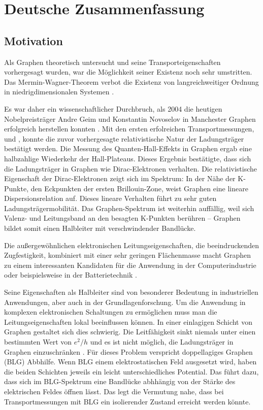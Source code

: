 \section*{Deutsche Zusammenfassung}
\subsection*{Motivation}

Als Graphen theoretisch untersucht und seine Transporteigenschaften vorhergesagt wurden, war die M\"oglichkeit seiner Existenz noch sehr umstritten. Das Mermin-Wagner-Theorem verbot die Existenz von langreichweitiger Ordnung in niedrigdimensionalen Systemen \cite{Mermin1966}.

Es war daher ein wissenschaftlicher Durchbruch, als 2004 die heutigen Nobelpreistr\"ager Andre Geim und Konstantin Novoselov in Manchester Graphen erfolgreich herstellen konnten \cite{Novoselov2004}. Mit den ersten erfolreichen Transportmessungen, \cite{Zhang2005} und \cite{Novoselov2005}, konnte die zuvor vorhergesagte relativistische Natur der Ladungstr\"ager \cite{Semenoff1984} best\"atigt werden. Die Messung des Quanten-Hall-Effekts in Graphen ergab eine halbzahlige Wiederkehr der Hall-Plateaus. Dieses Ergebnis best\"atigte, dass sich die Ladungstr\"ager in Graphen wie Dirac-Elektronen verhalten.
Die relativistische Eigenschaft der Dirac-Elektronen zeigt sich im Spektrum: In der N\"ahe der K-Punkte, den Eckpunkten der ersten Brillouin-Zone, weist Graphen eine lineare Dispersionsrelation auf. Dieses lineare Verhalten f\"uhrt zu sehr guten Ladungstr\"agermobilit\"at. Das Graphen-Spektrum ist weiterhin auff\"allig, weil sich Valenz- und Leitungsband an den besagten K-Punkten ber\"uhren -- Graphen bildet somit einen Halbleiter mit verschwindender Bandl\"ucke. 

Die au{\ss}ergew\"ohnlichen elektronischen Leitungseigenschaften, die beeindruckenden Zugfestigkeit, kombiniert mit einer sehr geringen Fl\"achenmasse macht Graphen zu einem interessanten Kandidaten f\"ur die Anwendung in der Computerindustrie \cite{Jurewicz2014} oder beispielsweise in der Batterietechnik \cite{Son2017}.

Seine Eigenschaften als Halbleiter sind von besonderer Bedeutung in industriellen Anwendungen, aber auch in der Grundlagenforschung. Um die Anwendung in komplexen elektronischen Schaltungen zu erm\"oglichen muss man die Leitungseigenschaften lokal beeinflussen k\"onnen. In einer einlagigen Schicht von Graphen gestaltet sich dies schwierig. Die Leitf\"ahigkeit sinkt niemals unter einen bestimmten Wert von $e^2/h$ und es ist nicht m\"oglich, die Ladungstr\"ager in Graphen einzuschr\"anken \cite{Katsnelson2006}. F\"ur dieses Problem verspricht doppellagiges Graphen (BLG) Abbhilfe. Wenn BLG einem elektrostatischen Feld ausgesetzt wird, haben die beiden Schichten jeweils ein leicht unterschiedliches Potential. Das f\"uhrt dazu, dass sich im BLG-Spektrum eine Bandl\"ucke abhh\"angig von der St\"arke des elektrischen Feldes \"offnen l\"asst. Das legt die Vermutung nahe, dass bei Transportmessungen mit BLG ein isolierender Zustand erreicht werden k\"onnte.

